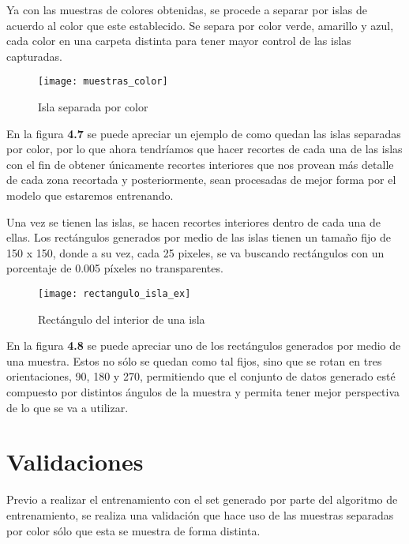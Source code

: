 Ya con las muestras de colores obtenidas, se procede a separar por islas de acuerdo al color que este establecido. Se separa por color verde, amarillo y azul, cada color en una carpeta distinta para tener mayor control de las islas capturadas.

\begin{figure}[H]
  \centering
  \begin{minipage}[b]{0.5\textwidth}
        \texttt{[image: muestras\_color]}
    \caption{Isla separada por color}
  \end{minipage}
\end{figure}

En la figura \textbf{4.7} se puede apreciar un ejemplo de como quedan las islas separadas por color, por lo que ahora tendríamos que hacer recortes de cada una de las islas con el fin de obtener únicamente recortes interiores que nos provean más detalle de cada zona recortada y posteriormente, sean procesadas de mejor forma por el modelo que estaremos entrenando. \\

\break

Una vez se tienen las islas, se hacen recortes interiores dentro de cada una de ellas. Los rectángulos generados por medio de las islas tienen un tamaño fijo de 150 x 150, donde a su vez, cada 25 pixeles, se va buscando rectángulos con un porcentaje de 0.005 píxeles no transparentes.


\begin{figure}[h]
  \centering
  \begin{minipage}[b]{0.7\textwidth}
        \texttt{[image: rectangulo\_isla\_ex]}
    \caption{Rectángulo del interior de una isla}
  \end{minipage}
\end{figure}


En la figura \textbf{4.8} se puede apreciar uno de los rectángulos generados por medio de una muestra. Estos no sólo se quedan como tal fijos, sino que se rotan en tres orientaciones, 90, 180 y 270, permitiendo que el conjunto de datos generado esté compuesto por distintos ángulos de la muestra y permita tener mejor perspectiva de lo que se va a utilizar.

\break

\section{Validaciones}

Previo a realizar el entrenamiento con el set generado por parte del algoritmo de entrenamiento, se realiza una validación que hace uso de las muestras separadas por color sólo que esta se muestra de forma distinta.

